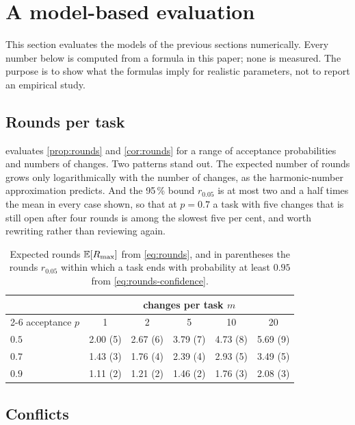 \section{A model-based evaluation}
\label{sec:evaluation}

This section evaluates the models of the previous sections numerically. Every
number below is computed from a formula in this paper; none is measured. The
purpose is to show what the formulas imply for realistic parameters, not to
report an empirical study.

\subsection{Rounds per task}

 evaluates \cref{prop:rounds} and \cref{cor:rounds} for a
range of acceptance probabilities and numbers of changes. Two patterns stand
out. The expected number of rounds grows only logarithmically with the number
of changes, as the harmonic-number approximation predicts. And the
95\,\% bound $r_{0.05}$ is at most two and a half times the mean in every case
shown, so that at $p = 0.7$ a task with five changes that is still open after
four rounds is among the slowest five per cent, and worth rewriting rather than
reviewing again.

\begin{table}[t]
\centering
\caption{Expected rounds $\mathbb{E}[R_{\max}]$ from \cref{eq:rounds}, and in
parentheses the rounds $r_{0.05}$ within which a task ends with probability
at least $0.95$ from \cref{eq:rounds-confidence}.}
\label{tab:rounds}
\begin{tabular}{@{}lccccc@{}}
\toprule
& \multicolumn{5}{c}{changes per task $m$} \\
\cmidrule(l){2-6}
acceptance $p$ & 1 & 2 & 5 & 10 & 20 \\
\midrule
$0.5$ & 2.00 (5) & 2.67 (6) & 3.79 (7) & 4.73 (8) & 5.69 (9) \\
$0.7$ & 1.43 (3) & 1.76 (4) & 2.39 (4) & 2.93 (5) & 3.49 (5) \\
$0.9$ & 1.11 (2) & 1.21 (2) & 1.46 (2) & 1.76 (3) & 2.08 (3) \\
\bottomrule
\end{tabular}
\end{table}

\subsection{Conflicts}

